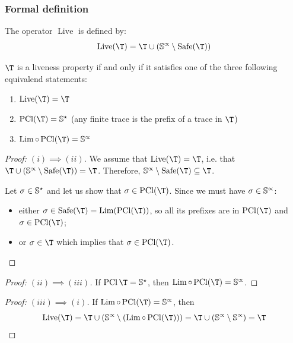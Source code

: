 \documentclass[toc]{../cs-classes/cs-classes}
\DeclareMathOperator{\pcl}{PCl}
\DeclareMathOperator{\Lim}{Lim}
\DeclareMathOperator{\safe}{Safe}
\DeclareMathOperator{\live}{Live}
\begin{document}
\subsubsection{Formal definition}
\begin{definition}[Operator $\live$]
    The operator $\live$ is defined by:
    \begin{equation*}
        \live(\T) = \T \cup (\S^\propto \setminus \safe(\T))
    \end{equation*}
\end{definition}

\begin{definition}
    $\T$ is a liveness property if and only if it satisfies one of the three following equivalend statements:   
    \begin{enumerate}[label=(\roman*)]
        \item $\live(\T) = \T$
        \item $\pcl(\T) = \S^\star$ (any finite trace is the prefix of a trace in $\T$)
        \item $\Lim \circ \pcl(\T) = \S^\propto$
    \end{enumerate}
\end{definition}
\begin{proof}[Proof: $(i) \implies (ii)$]
    We assume that $\live(\T) = \T$, i.e. that $\T\cup(\S^\propto\setminus\safe(\T)) = \T$. Therefore, $\S^\propto\setminus\safe(\T) \subseteq \T$.

    Let $\sigma\in\S^\star$ and let us show that $\sigma\in\pcl(\T)$. Since we must have $\sigma\in\S^\propto$:
    \begin{itemize}
        \item either $\sigma\in\safe(\T) = \Lim(\pcl(\T))$, so all its prefixes are in $\pcl(\T)$ and $\sigma\in\pcl(\T)$;
        \item or $\sigma\in\T$ which implies that $\sigma\in\pcl(\T)$.
    \end{itemize}
\end{proof}
\begin{proof}[Proof: $(ii) \implies (iii)$]
    If $\pcl{\T}=\S^\star$, then $\Lim\circ\pcl(\T) = \S^\propto$.
\end{proof}
\begin{proof}[Proof: $(iii) \implies (i)$]
    If $\Lim\circ\pcl(\T) = \S^\propto$, then
    \begin{equation*}
        \live(\T) = \T\cup(\S^\propto\setminus(\Lim\circ\pcl(\T))) = \T \cup (\S^\propto\setminus\S^\propto) = \T
    \end{equation*}
\end{proof}
\end{document}
